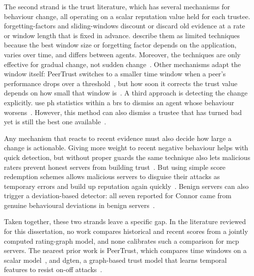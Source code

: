 The second strand is the trust literature, which has several mechanisms for behaviour change, all operating on a scalar reputation value held for each \gls{trustee}. \Glspl{forgetting-factor} and \glspl{sliding-window} discount or discard old evidence at a rate or window length that is fixed in advance. \textcite{Player2020} describe them as limited techniques because the best window size or forgetting factor depends on the application, varies over time, and differs between agents. Moreover, the techniques are only effective for gradual change, not sudden change~\cite[p.~6]{Player2020}. Other mechanisms adapt the window itself: PeerTrust switches to a smaller time window when a peer's performance drops over a threshold~\cite[p.~849]{LiXiong2004}, but how soon it corrects the trust value depends on how small that window is~\cite[p.~854]{LiXiong2004}. A third approach is detecting the change explicitly. \textcite{Parhizkar2022} use \gls{ph} statistics within a \gls{brs} to dismiss an agent whose behaviour worsens~\cite[p.~1]{Parhizkar2022}. However, this method can also dismiss a trustee that has turned bad yet is still the best one available~\cite[p.~11]{Parhizkar2022}.

Any mechanism that reacts to recent evidence must also decide how large a change is actionable. Giving more weight to recent negative behaviour helps with quick detection, but without proper guards the same technique also lets malicious raters prevent honest servers from building trust~\cite[p.~1:18]{Hoffman2009}. But using simple score \gls{redemption} schemes allows malicious servers to disguise their attacks as temporary errors and build up reputation again quickly~\cite[p.~1178]{Chae2015}. Benign servers can also trigger a deviation-based detector: all seven  reported for Connor came from genuine behavioural deviations in benign servers~\cite[p.~25]{Huang2026}.

Taken together, these two strands leave a specific gap. In the literature reviewed for this dissertation, no work compares historical and recent scores from a jointly computed rating-graph model, and none calibrates such a comparison for \gls{mcp} servers. The nearest prior work is PeerTrust, which compares time windows on a scalar model~\cite{LiXiong2004}, and \gls{dgten}, a graph-based trust model that learns temporal features to resist on-off attacks~\cite{Usman2025}.

